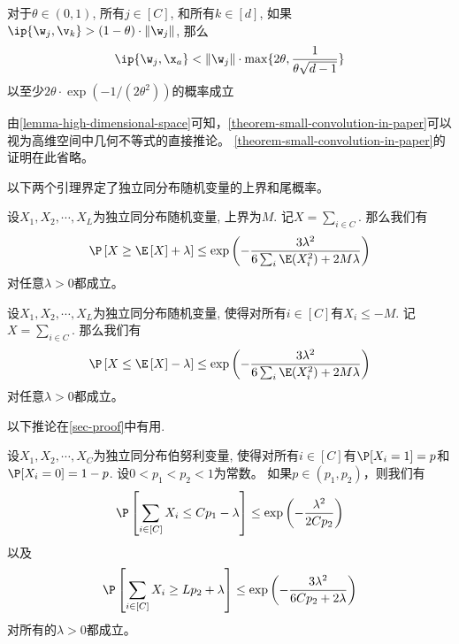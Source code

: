 \begin{theorem*}
    对于$\theta \in (0,1)$, 所有$j \in [C]$, 和所有$k \in [d]$, 如果$\ip{\w_j, \v_k} > (1 - \theta)\cdot \|\w_j\|$, 那么
    \begin{equation}
        \ip{{\w_j}, \x_a} < \|\w_j\| \cdot \max\{ 2\theta, \frac{1}{\theta \sqrt{d-1}} \}
    \end{equation}
    以至少$2\theta \cdot \exp(-1/(2\theta^2))$的概率成立
\end{theorem*}

由\cref{lemma-high-dimensional-space}可知，\cref{theorem-small-convolution-in-paper}可以视为高维空间中几何不等式的直接推论。
\cref{theorem-small-convolution-in-paper}的证明在此省略。

以下两个引理界定了独立同分布随机变量的上界和尾概率。
\begin{lemma}[尾概率上界]\label{lemma-concentration-inequality-upper-tail}
设$X_1, X_2, \cdots, X_L$为独立同分布随机变量, 上界为$M$. 
记$X = \sum_{i \in C}$. 
那么我们有
\begin{equation}
    \P\left[ X \geq \E\left[ X \right] + \lambda \right] 
    \leq 
    \exp{ 
        \left(- \frac{3\lambda^2}{6 \sum_i \E(X_i^2) + {2M\lambda} } 
        \right)
        }
\end{equation}
对任意$ \lambda >0$都成立。
\end{lemma}

\begin{lemma}[尾概率下界]\label{lemma-concentration-inequality-lower-tail}
设$X_1, X_2, \cdots, X_L$为独立同分布随机变量, 使得对所有$ i \in [C]$有$X_i \leq - M$. 
记$X = \sum_{i \in C}$. 
那么我们有
\begin{equation}
    \P\left[ X \leq \E\left[ X \right] - \lambda \right] 
    \leq 
    \exp{ 
        \left(- \frac{3\lambda^2}{6 \sum_i \E(X_i^2) + {2M\lambda} } 
        \right)
        }
\end{equation}
对任意$ \lambda >0$都成立。
\end{lemma}


以下推论在\cref{sec-proof}中有用.
\begin{corollary}\label{corollary-cp-lambda}
设$X_1, X_2, \cdots, X_C$为独立同分布伯努利变量, 使得对所有$ i \in [C]$有$\P[X_i = 1] = p$和$\P[X_i = 0] = 1-p$.
设$0 < p_1 < p_2 < 1$为常数。
如果$p \in  (p_1, p_2)$，则我们有
\begin{equation}
    \P \left[ \sum_{i \in [C]} X_i \leq C p_1 - \lambda \right] \leq \exp \left( - \frac{\lambda^2}{2 C p_2} \right)
\end{equation}
以及
\begin{equation}
    \P \left[ \sum_{i \in [C]} X_i \geq L p_2 + \lambda \right] \leq \exp \left( - \frac{3\lambda^2}{6C p_2 + 2\lambda} \right)
\end{equation}
对所有的$ \lambda >0$都成立。
\end{corollary}

